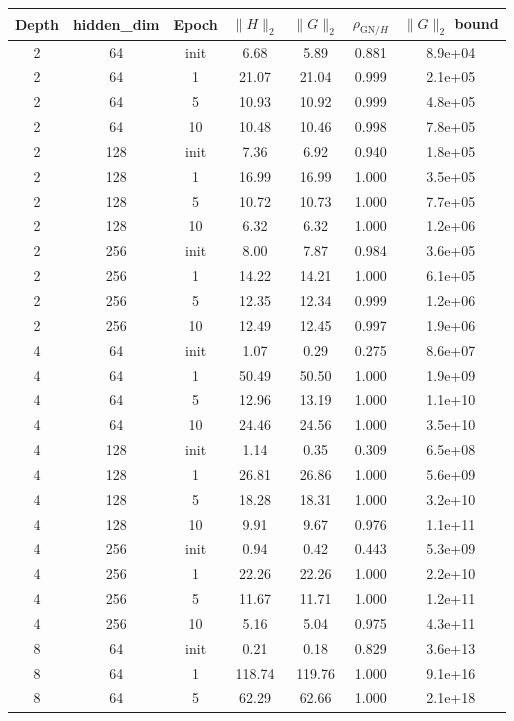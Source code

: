 \begin{tabular}{ccccccc}
\toprule
Depth & hidden\_dim & Epoch & $\|H\|_2$ & $\|G\|_2$ & $\rho_{\mathrm{GN}/H}$ & $\|G\|_2$ bound \\
\midrule
2 & 64 & init & 6.68 & 5.89 & 0.881 & 8.9e+04 \\
2 & 64 & 1 & 21.07 & 21.04 & 0.999 & 2.1e+05 \\
2 & 64 & 5 & 10.93 & 10.92 & 0.999 & 4.8e+05 \\
2 & 64 & 10 & 10.48 & 10.46 & 0.998 & 7.8e+05 \\
2 & 128 & init & 7.36 & 6.92 & 0.940 & 1.8e+05 \\
2 & 128 & 1 & 16.99 & 16.99 & 1.000 & 3.5e+05 \\
2 & 128 & 5 & 10.72 & 10.73 & 1.000 & 7.7e+05 \\
2 & 128 & 10 & 6.32 & 6.32 & 1.000 & 1.2e+06 \\
2 & 256 & init & 8.00 & 7.87 & 0.984 & 3.6e+05 \\
2 & 256 & 1 & 14.22 & 14.21 & 1.000 & 6.1e+05 \\
2 & 256 & 5 & 12.35 & 12.34 & 0.999 & 1.2e+06 \\
2 & 256 & 10 & 12.49 & 12.45 & 0.997 & 1.9e+06 \\
4 & 64 & init & 1.07 & 0.29 & 0.275 & 8.6e+07 \\
4 & 64 & 1 & 50.49 & 50.50 & 1.000 & 1.9e+09 \\
4 & 64 & 5 & 12.96 & 13.19 & 1.000 & 1.1e+10 \\
4 & 64 & 10 & 24.46 & 24.56 & 1.000 & 3.5e+10 \\
4 & 128 & init & 1.14 & 0.35 & 0.309 & 6.5e+08 \\
4 & 128 & 1 & 26.81 & 26.86 & 1.000 & 5.6e+09 \\
4 & 128 & 5 & 18.28 & 18.31 & 1.000 & 3.2e+10 \\
4 & 128 & 10 & 9.91 & 9.67 & 0.976 & 1.1e+11 \\
4 & 256 & init & 0.94 & 0.42 & 0.443 & 5.3e+09 \\
4 & 256 & 1 & 22.26 & 22.26 & 1.000 & 2.2e+10 \\
4 & 256 & 5 & 11.67 & 11.71 & 1.000 & 1.2e+11 \\
4 & 256 & 10 & 5.16 & 5.04 & 0.975 & 4.3e+11 \\
8 & 64 & init & 0.21 & 0.18 & 0.829 & 3.6e+13 \\
8 & 64 & 1 & 118.74 & 119.76 & 1.000 & 9.1e+16 \\
8 & 64 & 5 & 62.29 & 62.66 & 1.000 & 2.1e+18 \\

\end{tabular}
